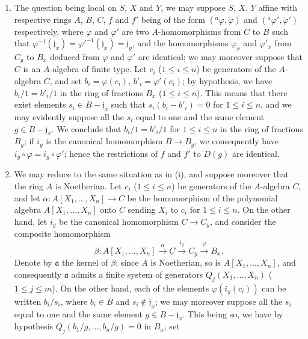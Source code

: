 \begin{enumerate}
  \item[(i)] The question being local on $S$, $X$ and $Y$, we may suppose
    $S$, $X$, $Y$ affine with respective rings $A$, $B$, $C$, $f$ and $f'$
    being of the form $({}^a\varphi,\widetilde{\varphi})$ and
    $({}^a\varphi',\widetilde{\varphi}')$ respectively, where $\varphi$ and
    $\varphi'$ are two $A$-homomorphisms from $C$ to $B$ such that
    $\varphi^{-1}(\mathfrak{j}_x)={\varphi'}^{-1}(\mathfrak{j}_x)
    =\mathfrak{j}_y$, and the homomorphisms $\varphi_x$ and $\varphi'_x$ from
    $C_y$ to $B_x$ deduced from $\varphi$ and $\varphi'$ are identical;
    we may moreover suppose that $C$ is an $A$-algebra of finite type. Let
    $c_i$ ($1\leq i\leq n$) be generators of the $A$-algebra $C$, and set
    $b_i=\varphi(c_i)$, $b'_i=\varphi'(c_i)$; by hypothesis, we have
    $b_i/1=b'_i/1$ in the ring of fractions $B_x$ ($1\leq i\leq n$). This
    means that there exist elements $s_i\in B-\mathfrak{j}_x$ such that
    $s_i(b_i-b'_i)=0$ for $1\leq i\leq n$, and we may evidently suppose
    all the $s_i$ equal to one and the same element $g\in B-\mathfrak{j}_x$. We
    conclude that $b_i/1=b'_i/1$ for $1\leq i\leq n$ in the ring of
    fractions $B_g$; if $i_g$ is the canonical homomorphism $B\to B_g$, we
    consequently have $i_g\circ\varphi=i_g\circ\varphi'$; hence the
    restrictions of $f$ and $f'$ to $D(g)$ are identical.
  \item[(ii)] We may reduce to the same situation as in (i), and suppose
    moreover that the ring $A$ is Noetherian. Let $c_i$
    ($1\leq i\leq n$) be generators of the $A$-algebra $C$, and let
    $\alpha:A[X_1,\ldots,X_n]\to C$ be the homomorphism of the polynomial
    algebra $A[X_1,\ldots,X_n]$ onto $C$ sending $X_i$ to $c_i$ for
    $1\leq i\leq n$. On the other hand, let $i_y$ be the canonical homomorphism
    $C\to C_y$, and consider the composite homomorphism
    \[
      \beta:A[X_1,\ldots,X_n]
      \xrightarrow{\alpha} C
      \xrightarrow{i_y} C_y
      \xrightarrow{\varphi} B_x.
    \]
    Denote by $\mathfrak{a}$ the kernel of $\beta$; since $A$ is
    Noetherian, so is $A[X_1,\ldots,X_n]$, and consequently
    $\mathfrak{a}$ admits a finite system of generators
    $Q_j(X_1,\ldots,X_n)$ ($1\leq j\leq m$). On the other hand, each of the
    elements $\varphi(i_y(c_i))$ can be written $b_i/s_i$, where $b_i\in B$ and
    $s_i\notin\mathfrak{j}_x$; we may moreover suppose all the $s_i$ equal
    to one and the same element $g\in B-\mathfrak{j}_x$. This being so, we have
    by hypothesis $Q_j(b_1/g,\ldots,b_n/g)=0$ in $B_x$; set

\end{enumerate}
